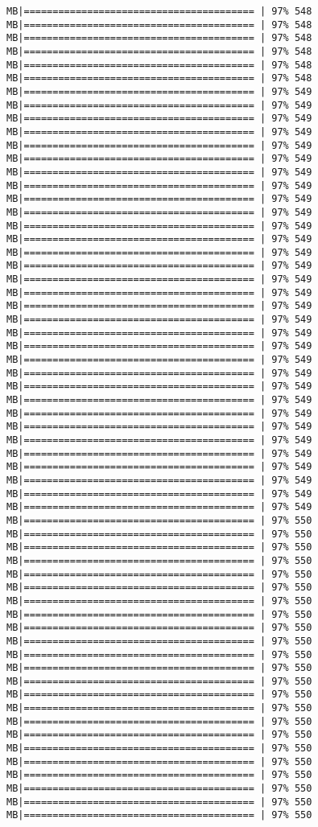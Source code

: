 \documentclass[
]{article}
\begin{document}
\begin{verbatim}
MB|======================================== | 97% 548 MB|======================================== | 97% 548 MB|======================================== | 97% 548 MB|======================================== | 97% 548 MB|======================================== | 97% 548 MB|======================================== | 97% 548 MB|======================================== | 97% 549 MB|======================================== | 97% 549 MB|======================================== | 97% 549 MB|======================================== | 97% 549 MB|======================================== | 97% 549 MB|======================================== | 97% 549 MB|======================================== | 97% 549 MB|======================================== | 97% 549 MB|======================================== | 97% 549 MB|======================================== | 97% 549 MB|======================================== | 97% 549 MB|======================================== | 97% 549 MB|======================================== | 97% 549 MB|======================================== | 97% 549 MB|======================================== | 97% 549 MB|======================================== | 97% 549 MB|======================================== | 97% 549 MB|======================================== | 97% 549 MB|======================================== | 97% 549 MB|======================================== | 97% 549 MB|======================================== | 97% 549 MB|======================================== | 97% 549 MB|======================================== | 97% 549 MB|======================================== | 97% 549 MB|======================================== | 97% 549 MB|======================================== | 97% 549 MB|======================================== | 97% 549 MB|======================================== | 97% 549 MB|======================================== | 97% 549 MB|======================================== | 97% 549 MB|======================================== | 97% 549 MB|======================================== | 97% 549 MB|======================================== | 97% 550 MB|======================================== | 97% 550 MB|======================================== | 97% 550 MB|======================================== | 97% 550 MB|======================================== | 97% 550 MB|======================================== | 97% 550 MB|======================================== | 97% 550 MB|======================================== | 97% 550 MB|======================================== | 97% 550 MB|======================================== | 97% 550 MB|======================================== | 97% 550 MB|======================================== | 97% 550 MB|======================================== | 97% 550 MB|======================================== | 97% 550 MB|======================================== | 97% 550 MB|======================================== | 97% 550 MB|======================================== | 97% 550 MB|======================================== | 97% 550 MB|======================================== | 97% 550 MB|======================================== | 97% 550 MB|======================================== | 97% 550 MB|======================================== | 97% 550 MB|======================================== | 97% 550 
\end{verbatim}
\end{document}
